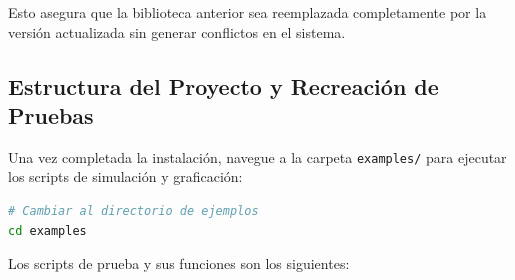 \documentclass[a4paper,11pt]{article}
\begin{document}
Esto asegura que la biblioteca anterior sea reemplazada completamente por la versión actualizada sin generar conflictos en el sistema.

\subsection{Estructura del Proyecto y Recreación de Pruebas}
Una vez completada la instalación, navegue a la carpeta \texttt{examples/} para ejecutar los scripts de simulación y graficación:

\begin{lstlisting}[language=bash]
# Cambiar al directorio de ejemplos
cd examples
\end{lstlisting}

Los scripts de prueba y sus funciones son los siguientes:
\end{document}
